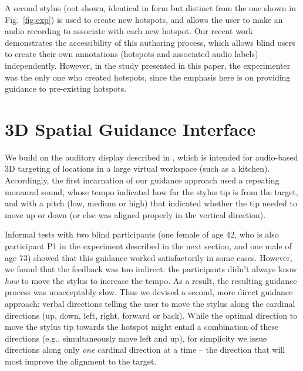 \documentclass[runningheads]{res/templates/llncs}
\begin{document}
A second stylus (not shown, identical in form but distinct from the one
shown in Fig.~\ref{fig:exp}) is used to create new hotspots, and allows the
user to make an audio recording to associate with each new hotspot. Our
recent work \cite{coughlanTowardsAccessibleAudioLabeling2020}
demonstrates the accessibility of this authoring process, which allows
blind users to create their own annotations (hotspots and associated
audio labels) independently. However, in the study presented in this
paper, the experimenter was the only one who created hotspots, since the
emphasis here is on providing guidance to pre-existing hotspots.

\hypertarget{material}{%
\section{3D Spatial Guidance Interface}\label{material}}

We build on the auditory display described in \cite{mayAuditoryDisplaysFacilitate2019}, which is intended for
audio-based 3D targeting of locations in a large virtual workspace (such as a kitchen). 
Accordingly, the first incarnation of our guidance approach used a repeating monaural sound, whose tempo indicated how far
the stylus tip is from the target, and with a pitch (low, medium or high) that indicated whether the tip needed to move up or down (or else was aligned properly in the vertical direction).

Informal tests with two blind participants (one female of age 42, who is also participant P1 in the experiment described in the next section, and one male of age 73) showed that this guidance worked satisfactorily in some cases. 
However, we found that the feedback was too indirect: the participants didn't always know {\em how} to move the stylus to increase the tempo. 
As a result, the resulting guidance process was unacceptably slow. 
Thus we devised a second, more direct guidance approach: verbal directions telling the user to move the stylus along the cardinal directions (up, down, left, right, forward or back). 
While the optimal direction to move the stylus tip towards the hotspot might entail a combination of these directions (e.g., simultaneously move left and up), for simplicity we issue directions along only {\em one} cardinal direction at a time -- the direction that will most improve the alignment to the target.
\end{document}
